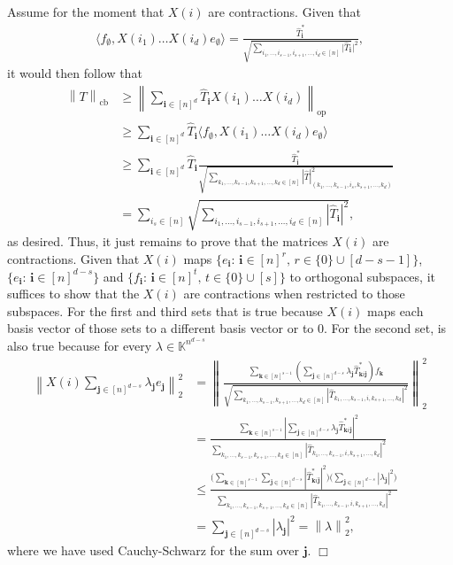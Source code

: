 \documentclass[11pt]{article}
\newcommand{\norm}[1]{\left\|{#1}\right\|}
\theoremstyle{plain}
\DeclareMathOperator{\cb}{cb}
\renewcommand{\cb}{{\mathrm{cb}}}
\DeclareMathOperator{\op}{op}
\newcommand{\ind}[1]{\mathbf{#1}}
\theoremstyle{plain}
\theoremstyle{definition}
\theoremstyle{remark}
\renewenvironment{proof}[1][]{
    \begin{trivlist}
    \item[\hspace{\labelsep}{\em\noindent Proof#1:\/}]}
    {{\hfill$\Box$}
    \end{trivlist}
}
\theoremstyle{named}
\begin{document}
\begin{proof}
    Assume for the moment that $X(i)$ are contractions. Given that  
    \begin{align*}
        \langle f_\emptyset,X(i_1)\dots X(i_d)e_\emptyset\rangle=\frac{\widehat T_\ind i^*}{\sqrt{\sum_{ i_1,\dots,i_{s-1},i_{s+1},\dots,i_d\in [n]}|\widehat T_{\ind i}}|^2},
    \end{align*}
    it would then follow that 
    \begin{align*}
        \norm{T}_{\cb}&\geq \norm{\sum_{\ind i\in [n]^d}\widehat T_{\ind i}X(i_1)\dots X(i_d)}_{\op}\\
        &\geq  \sum_{\ind i\in [n]^d}\widehat T_{\ind i}\langle f_\emptyset,X(i_1)\dots X(i_d)e_\emptyset\rangle\\
        &\geq \sum_{\ind i\in [n]^d}\widehat T_{\ind i}\frac{\widehat T_\ind i^*}{\sqrt{\sum_{ k_1,\dots,k_{s-1},k_{s+1},\dots,k_d\in [n] }|\widehat T|^2_{(k_1,\dots,k_{s-1},i_s,k_{s+1},\dots,k_d)}}}\\        &=\sum_{i_s\in [n]}\sqrt{\sum_{i_1,\dots,i_{s-1},i_{s+1},\dots,i_d\in [n]}|\widehat T_\ind{i}|^2},
    \end{align*}
    as desired. Thus, it just remains to prove that the matrices $X(i)$ are contractions. Given that $X(i)$ maps $\{e_{\ind i}:\, \ind i\in [n]^r,\, r\in\{0\}\cup [d-s-1]\}$, $\{e_{\ind i}:\, \ind i\in [n]^{d-s}\}$ and $\{f_{\ind i}:\, \ind i\in[n]^t,\, t\in\{0\}\cup [s]\}$ to orthogonal subspaces, it suffices to show that the $X(i)$ are contractions when restricted to those subspaces. For the first and third sets that is true because  $X(i)$ maps each basis vector of those sets to a different basis vector or to $0$. For the second set, is also true because for every $\lambda \in \mathbb K^{n^{d-s}}$
    \begin{align*}
        \norm{X(i)\sum_{\ind j\in [n]^{d-s}}\lambda_{\ind j}e_{\ind j}}_2^2&=\norm{\frac{\sum_{\ind k\in [n]^{s-1}}(\sum_{\ind j\in [n]^{d-s}}\lambda_{\ind j}\widehat T_{\ind k i\ind j}^*)f_{\ind k}}{\sqrt{\sum_{k_1,\dots,k_{s-1},k_{s+1},\dots,k_d\in [n] }|\widehat T_{k_1,\dots,k_{s-1},i,k_{s+1},\dots,k_d}|^2}}}_2^2\\
        &=\frac{\sum_{\ind k\in [n]^{s-1}}|\sum_{\ind j\in [n]^{d-s}}\lambda_{\ind j}\widehat T_{\ind k i\ind j}^*|^2}{\sum_{k_1,\dots,k_{s-1},k_{s+1},\dots,k_d\in [n] }|\widehat T_{k_1,\dots,k_{s-1},i,k_{s+1},\dots,k_d}|^2}\\
        &\leq \frac{\Big(\sum_{\ind k\in [n]^{s-1}}\sum_{\ind j\in [n]^{d-s}}|\widehat T_{\ind k i\ind j}^*|^2\Big)\Big(\sum_{\ind j\in [n]^{d-s}}|\lambda_{\ind j}|^2\Big)}{\sum_{k_1,\dots,k_{s-1},k_{s+1},\dots,k_d\in [n] }|\widehat T_{k_1,\dots,k_{s-1},i,k_{s+1},\dots,k_d}|^2}\\
        &=\sum_{\ind j\in [n]^{d-s}}|\lambda_{\ind j}|^2=\norm{\lambda}^2_2,
    \end{align*}
    where  we have used Cauchy-Schwarz for the sum over $\ind j$.
\end{proof}
\end{document}
